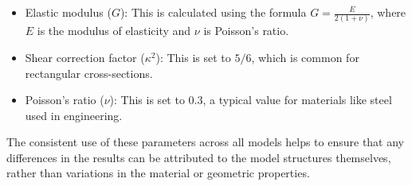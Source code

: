 \documentclass[../../main.tex]{subfiles}
\begin{document}
\begin{itemize}
    \item Elastic modulus ($G$): This is calculated using the formula $G = \frac{E}{2(1+\nu)}$, where $E$ is the modulus of elasticity and $\nu$ is Poisson's ratio. 

    \item Shear correction factor ($\kappa^2$): This is set to $5/6$, which is common for rectangular cross-sections.

    \item Poisson's ratio ($\nu$): This is set to $0.3$, a typical value for materials like steel used in engineering.
\end{itemize}

The consistent use of these parameters across all models helps to ensure that any differences in the results can be attributed to the model structures themselves, rather than variations in the material or geometric properties.
\end{document}

